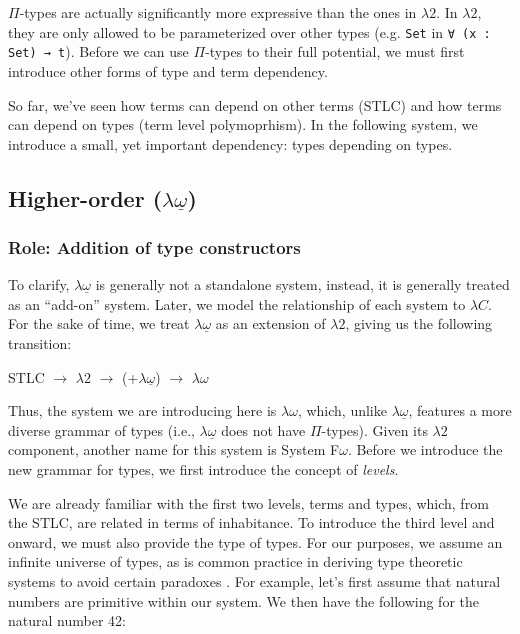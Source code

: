 \documentclass[12pt]{article}
\begin{document}
\(\Pi\)-types are actually significantly more expressive than the ones in
\(\lambda2\). In \(\lambda2\), they are only allowed to be parameterized
over other types (e.g. {\tt Set} in {\tt ∀ (x : Set) → t}). Before we can use
\(\Pi\)-types to their full potential, we must first introduce other forms of
type and term dependency.

So far, we've seen how terms can depend on other terms (STLC) and how terms can
depend on types (term level polymoprhism). In the following system, we introduce
a small, yet important dependency: types depending on types.

\subsection*{Higher-order (\(\lambda\underline{\omega}\))}
\subsubsection*{Role: Addition of type constructors}

To clarify, \(\lambda\underline{\omega}\) is generally not a standalone system,
instead, it is generally treated as an ``add-on'' system. Later, we model the
relationship of each system to \(\lambda C\). For the sake of time, we treat
\(\lambda\underline{\omega}\) as an extension of \(\lambda2\), giving us the
following transition:

\begin{center}
\begin{minipage}{0.4\textwidth}
STLC \(\rightarrow\) \(\lambda2\) \(\rightarrow\) (+\(\lambda\underline{\omega}\)) \(\rightarrow\) \(\lambda\omega\)
\end{minipage}
\end{center}

Thus, the system we are introducing here is \(\lambda\omega\), which, unlike
\(\lambda\underline{\omega}\), features a more diverse grammar of types (i.e.,
\(\lambda\underline{\omega}\) does not have \(\Pi\)-types). Given its \(\lambda2\)
component, another name for this system is System F\(\omega\). Before we introduce
the new grammar for types, we first introduce the concept of {\em levels}.

We are already familiar with the first two levels, terms and types, which, from
the STLC, are related in terms of inhabitance. To introduce the third level and
onward, we must also provide the type of types. For our purposes, we assume an
infinite universe of types, as is common practice in deriving type theoretic
systems to avoid certain paradoxes \cite{}. For example, let's first assume that
natural numbers are primitive within our system. We then have the following for
the natural number 42:
\end{document}
